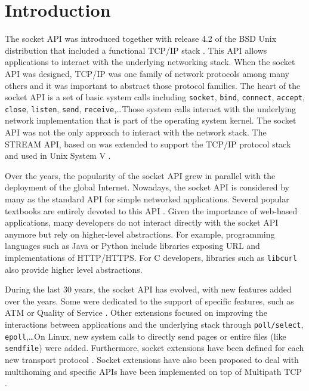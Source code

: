 \section{Introduction}

The socket API was introduced together with release 4.2 of
the BSD Unix distribution that included a functional TCP/IP stack
\cite{Quarterman:BSD}. This API allows applications to interact with
the underlying networking stack. When the socket API
was designed, TCP/IP was one family of network protocols among many
others and it was important to abstract those protocol families.
The heart of the socket API is  a set of basic system calls
including \texttt{socket}, \texttt{bind}, \texttt{connect},
\texttt{accept}, \texttt{close}, \texttt{listen}, \texttt{send},
\texttt{receive},\ldots Those system calls interact with the
underlying network implementation that is part of the operating
system kernel. The socket API was not the only approach to
interact with the network stack. The STREAM API, based on
\cite{ritchie1984unix} was extended to support the TCP/IP protocol
stack and used in Unix System V \cite{rago1993unix}.

Over the years, the popularity of the socket API grew in parallel
with the deployment of the global Internet. Nowadays, the
socket API is considered by many as the standard API for
simple networked applications. Several popular textbooks are entirely
devoted to this API \cite{Stevens:UNP,donahoo2001pocket}. Given the
importance of web-based applications, many developers do not interact
directly with the socket API anymore but rely on higher-level
abstractions. For example, programming languages such as Java or Python
include libraries exposing URL and implementations of
HTTP/HTTPS. For C developers, libraries such as \texttt{libcurl} 
also provide higher level abstractions.

During the last 30 years, the socket API has evolved, with new features added
over the years. Some were dedicated to the support of specific features, such
as ATM \cite{almesberger1998using} or Quality of Service
\cite{abbasi2002quality}. Other extensions \cite{Provos_Scalable:2000,
gammo2004comparing}
focused on improving the
interactions between applications and the underlying stack through
\texttt{poll/select}, \texttt{epoll},\ldots On Linux, new system
calls to directly send pages or entire files (like \texttt{sendfile})
were added. Furthermore, socket extensions have been defined
for each new transport protocol \cite{schier2012using,natarajan2009sctp}.
Socket extensions have also been proposed to deal with multihoming
\cite{Schmidt:intents} and specific APIs have been implemented on top
of Multipath TCP \cite{hesmans2015smapp,hesmans2016enhanced}.

